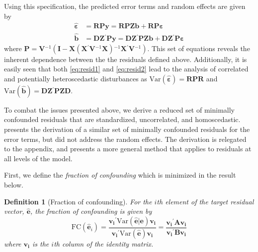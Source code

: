 \documentclass[11pt]{article} %
\newtheorem{definition}{Definition}
\newcommand{\inv}{\ensuremath{^{-1}}}
\newcommand{\trans}{\ensuremath{^\prime}}
\newcommand{\var}{\ensuremath{\mathrm{Var}}}
\begin{document}
Using this specification, the predicted error terms and random effects are given by 
%
\begin{align}
\widehat{\bm{\varepsilon}} &= \bm{RPy} = \bm{RPZb} + \bm{RP \varepsilon} \label{eq:resid1}\\
\widehat{\bm{b}} &= \bm{DZ}\trans \bm{Py} = \bm{DZ}\trans \bm{PZb} + \bm{DZ}\trans \bm{P \varepsilon} \label{eq:resid2}
\end{align}
%
where $\bm{P} = \bm{V}\inv( \bm{I} - \bm{X} (\bm{X}\trans \bm{V}\inv \bm{X})\inv \bm{X}\trans \bm{V}\inv)$. This  set of equations %
reveals the inherent dependence between the the residuals defined above.
Additionally, it is easily seen that both \eqref{eq:resid1} and \eqref{eq:resid2} lead to the analysis of correlated and potentially heteroscedastic disturbances as $\var(\widehat{\bm{\varepsilon}}) = \bm{RPR}$ and $\var(\widehat{\bm{b}}) = \bm{DZ}\trans \bm{PZD}$.

To combat the issues presented above, we derive a reduced set of minimally confounded residuals that are standardized, uncorrelated, and homoscedastic. \cite{HildenMinton:1995wh} presents the derivation of a similar set of minimally confounded residuals for the error terms, but did not address the random effects. The derivation is relegated to the appendix, and presents a more general method that applies to residuals at all levels of the model.

First, we define the \emph{fraction of confounding} \citep{HildenMinton:1995wh} which is minimized in the result below. \\

\begin{definition}[Fraction of confounding]\label{def:fc1}
For the $i$th element of the target residual vector, $\widehat{\bm{e}}$, the fraction of confounding is given by
%
\begin{equation}\label{eq:fc}
	\text{FC}(\widehat{\bm{e}}_i) 
	= \frac{\bm{v_i}\trans \var(\widehat{\bm{e}} | \bm{e}) \bm{v_i}}
		{\bm{v_i}\trans \var(\widehat{\bm{e}}) \bm{v_i}}
	= \frac{\bm{v_i}\trans \bm{A} \bm{v_i}}
		{\bm{v_i}\trans \bm{B} \bm{v_i}}
\end{equation}
%
where $\bm{v_i}$ is the $i$th column of the identity matrix.
\end{definition}
\end{document}
